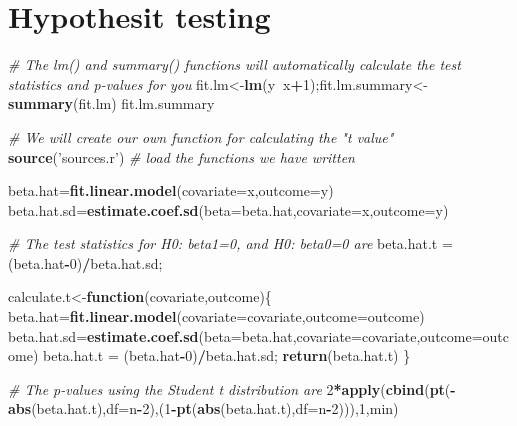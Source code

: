 \documentclass[12pt,]{book}
\newenvironment{Shaded}{\begin{snugshade}}{\end{snugshade}}
\newcommand{\KeywordTok}[1]{\textcolor[rgb]{0.13,0.29,0.53}{\textbf{#1}}}
\newcommand{\DataTypeTok}[1]{\textcolor[rgb]{0.13,0.29,0.53}{#1}}
\newcommand{\DecValTok}[1]{\textcolor[rgb]{0.00,0.00,0.81}{#1}}
\newcommand{\StringTok}[1]{\textcolor[rgb]{0.31,0.60,0.02}{#1}}
\newcommand{\CommentTok}[1]{\textcolor[rgb]{0.56,0.35,0.01}{\textit{#1}}}
\newcommand{\ControlFlowTok}[1]{\textcolor[rgb]{0.13,0.29,0.53}{\textbf{#1}}}
\newcommand{\OperatorTok}[1]{\textcolor[rgb]{0.81,0.36,0.00}{\textbf{#1}}}
\newcommand{\NormalTok}[1]{#1}
\begin{document}
\section{Hypothesit testing}\label{hypothesit-testing}

\begin{Shaded}
\begin{Highlighting}[]
\CommentTok{# The lm() and summary() functions will automatically calculate the test statistics and p-values for you }
\NormalTok{fit.lm<-}\KeywordTok{lm}\NormalTok{(y}\OperatorTok{~}\NormalTok{x}\OperatorTok{+}\DecValTok{1}\NormalTok{);fit.lm.summary<-}\KeywordTok{summary}\NormalTok{(fit.lm)}
\NormalTok{fit.lm.summary}
\end{Highlighting}
\end{Shaded}

\begin{Shaded}
\begin{Highlighting}[]
\CommentTok{# We will create our own function for calculating the "t value"}
\KeywordTok{source}\NormalTok{(}\StringTok{'sources.r'}\NormalTok{) }\CommentTok{# load the functions we have written }

\NormalTok{beta.hat=}\KeywordTok{fit.linear.model}\NormalTok{(}\DataTypeTok{covariate=}\NormalTok{x,}\DataTypeTok{outcome=}\NormalTok{y)}
\NormalTok{beta.hat.sd=}\KeywordTok{estimate.coef.sd}\NormalTok{(}\DataTypeTok{beta=}\NormalTok{beta.hat,}\DataTypeTok{covariate=}\NormalTok{x,}\DataTypeTok{outcome=}\NormalTok{y)}

\CommentTok{# The test statistics for H0: beta1=0, and H0: beta0=0 are }
\NormalTok{beta.hat.t =}\StringTok{ }\NormalTok{(beta.hat}\OperatorTok{-}\DecValTok{0}\NormalTok{)}\OperatorTok{/}\NormalTok{beta.hat.sd;}

\NormalTok{calculate.t<-}\ControlFlowTok{function}\NormalTok{(covariate,outcome)\{}
\NormalTok{  beta.hat=}\KeywordTok{fit.linear.model}\NormalTok{(}\DataTypeTok{covariate=}\NormalTok{covariate,}\DataTypeTok{outcome=}\NormalTok{outcome)}
\NormalTok{  beta.hat.sd=}\KeywordTok{estimate.coef.sd}\NormalTok{(}\DataTypeTok{beta=}\NormalTok{beta.hat,}\DataTypeTok{covariate=}\NormalTok{covariate,}\DataTypeTok{outcome=}\NormalTok{outcome)}
\NormalTok{  beta.hat.t =}\StringTok{ }\NormalTok{(beta.hat}\OperatorTok{-}\DecValTok{0}\NormalTok{)}\OperatorTok{/}\NormalTok{beta.hat.sd;}
  \KeywordTok{return}\NormalTok{(beta.hat.t)}
\NormalTok{\}}

\CommentTok{# The p-values using the Student t distribution are }
\DecValTok{2}\OperatorTok{*}\KeywordTok{apply}\NormalTok{(}\KeywordTok{cbind}\NormalTok{(}\KeywordTok{pt}\NormalTok{(}\OperatorTok{-}\KeywordTok{abs}\NormalTok{(beta.hat.t),}\DataTypeTok{df=}\NormalTok{n}\OperatorTok{-}\DecValTok{2}\NormalTok{),(}\DecValTok{1}\OperatorTok{-}\KeywordTok{pt}\NormalTok{(}\KeywordTok{abs}\NormalTok{(beta.hat.t),}\DataTypeTok{df=}\NormalTok{n}\OperatorTok{-}\DecValTok{2}\NormalTok{))),}\DecValTok{1}\NormalTok{,min)}


\end{Highlighting}
\end{Shaded}
\end{document}
